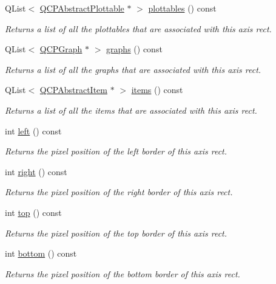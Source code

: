 \begin{DoxyCompactItemize}
Q\+List$<$ \hyperlink{classQCPAbstractPlottable}{Q\+C\+P\+Abstract\+Plottable} $\ast$ $>$ \hyperlink{classQCPAxisRect_a5b0d629c8de5572945eeae79a142296e}{plottables} () const 
\begin{DoxyCompactList}\small\item\em Returns a list of all the plottables that are associated with this axis rect. \end{DoxyCompactList}\item 
Q\+List$<$ \hyperlink{classQCPGraph}{Q\+C\+P\+Graph} $\ast$ $>$ \hyperlink{classQCPAxisRect_afa4ff90901d9275f670e24b40e3c1b25}{graphs} () const 
\begin{DoxyCompactList}\small\item\em Returns a list of all the graphs that are associated with this axis rect. \end{DoxyCompactList}\item 
Q\+List$<$ \hyperlink{classQCPAbstractItem}{Q\+C\+P\+Abstract\+Item} $\ast$ $>$ \hyperlink{classQCPAxisRect_a0f17ed539962cfcbaca8ce0b1776c840}{items} () const 
\begin{DoxyCompactList}\small\item\em Returns a list of all the items that are associated with this axis rect. \end{DoxyCompactList}\item 
int \hyperlink{classQCPAxisRect_a55b3ecf72a3a65b053f7651b88db458d}{left} () const 
\begin{DoxyCompactList}\small\item\em Returns the pixel position of the left border of this axis rect. \end{DoxyCompactList}\item 
int \hyperlink{classQCPAxisRect_a6d0f989fc552aa2b563cf82f8fc81e61}{right} () const 
\begin{DoxyCompactList}\small\item\em Returns the pixel position of the right border of this axis rect. \end{DoxyCompactList}\item 
int \hyperlink{classQCPAxisRect_ac45aef1eb75cea46b241b6303028a607}{top} () const 
\begin{DoxyCompactList}\small\item\em Returns the pixel position of the top border of this axis rect. \end{DoxyCompactList}\item 
int \hyperlink{classQCPAxisRect_af2b5982ebe7e6f781b9bf1cc371a60d8}{bottom} () const 
\begin{DoxyCompactList}\small\item\em Returns the pixel position of the bottom border of this axis rect. \end{DoxyCompactList}\item 

\end{DoxyCompactItemize}
